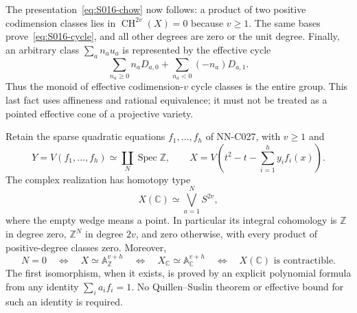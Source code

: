The presentation~\eqref{eq:S016-chow} now follows: a product of two
positive codimension classes lies in $\operatorname{CH}^{2v}(X)=0$
because $v\ge1$. The same bases prove~\eqref{eq:S016-cycle}, and all
other degrees are zero or the unit degree. Finally, an arbitrary
class $\sum_a n_a u_a$ is represented by the effective cycle
\[
 \sum_{n_a\ge0}n_a D_{a,0}
          +\sum_{n_a<0}(-n_a)D_{a,1}.
\]
Thus the monoid of effective codimension-$v$ cycle classes is the
entire group. This last fact uses affineness and rational equivalence;
it must not be treated as a pointed effective cone of a projective variety.

\begin{proposition}
Retain the sparse quadratic equations $f_1,\ldots,f_h$ of NN-C027,
with $v\geq1$ and
\[
 Y=V(f_1,\ldots,f_h)\simeq\coprod_N\operatorname{Spec}\mathbb Z,
 \qquad
 X=V\left(t^2-t-\sum_{i=1}^h y_i f_i(x)\right).
\]
The complex realization has homotopy type
\[
                      X(\mathbb C)\simeq\bigvee_{a=1}^{N}S^{2v},
\]
where the empty wedge means a point. In particular its integral
cohomology is $\mathbb Z$ in degree zero, $\mathbb Z^N$ in degree $2v$,
and zero otherwise, with every product of positive-degree classes zero.
Moreover,
\[
 N=0\quad\Longleftrightarrow\quad
 X\simeq\mathbb A^{v+h}_{\mathbb Z}
 \quad\Longleftrightarrow\quad
 X_{\mathbb C}\simeq\mathbb A^{v+h}_{\mathbb C}
 \quad\Longleftrightarrow\quad X(\mathbb C)\text{ is contractible}.
\]
The first isomorphism, when it exists, is proved by an explicit
polynomial formula from any identity $\sum_i a_i f_i=1$.
No Quillen--Suslin theorem or effective bound for such an identity is
required.
\end{proposition}


